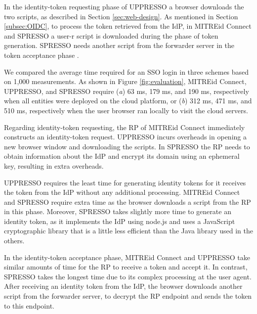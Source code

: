 In the identity-token requesting phase of UPPRESSO a browser downloads the two scripts,
    as described in Section \ref{sec:web-design}.
As mentioned in Section \ref{subsec:OIDC},
 to process the token retrieved from the IdP, %
    in MITREid Connect and SPRESSO a user-r script is downloaded during the phase of token generation.
SPRESSO needs another script from the forwarder server in the token acceptance phase \cite{SPRESSO}.

We compared the average time required for an SSO login in three schemes based on 1,000 measurements. As shown in Figure \ref{fig:evaluation},
MITREid Connect, UPPRESSO, and SPRESSO require (\emph{a}) 63 ms, 179 ms, and 190 ms, respectively when all entities were deployed on the cloud platform,
 or (\emph{b}) 312 ms, 471 ms, and 510 ms, respectively when the user browser ran locally to visit the cloud servers.

Regarding identity-token requesting, %
the RP of MITREid Connect immediately constructs an identity-token request. %
UPPRESSO incurs overheads in opening a new browser window and downloading the scripts.
%
%
In SPRESSO the RP needs to obtain information about the IdP %
and encrypt its domain using an ephemeral key, resulting in extra overheads.

UPPRESSO requires the least time for generating identity tokens for it receives the token from the IdP without any additional processing.
MITREid Connect and SPRESSO require extra time as the browser downloads a script from the RP in this phase. %
Moreover, SPRESSO takes slightly more time to generate an identity token, as it implements the IdP using node.js and uses a JavaScript cryptographic library that is a little less efficient than the Java library used in the others.

In the identity-token acceptance phase, 
MITREid Connect and UPPRESSO take similar amounts of time for the RP to receive a token and accept it.
In contrast, SPRESSO takes the longest time due to its complex processing at the user agent.
After receiving an identity token from the IdP, the browser downloads another script from the forwarder server, to decrypt the RP endpoint and sends the token to this endpoint.

